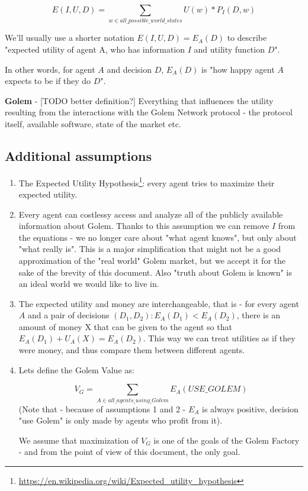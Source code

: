 \documentclass{article}
\begin{document}
\begin{equation}
E(I, U, D) = \sum_{w \in all\_possible\_world\_states}U(w) * P_I(D, w)
\end{equation}

We'll usually use a shorter notation $E(I, U, D) = E_A(D)$ to describe "expected utility of agent A, who has information $I$ and utility function $D$".

In other words, for agent $A$ and decision $D$, $E_A(D)$ is "how happy agent $A$ expects to be if they do $D$".
\newline

\textbf{Golem} - [TODO better definition?] Everything that influences the utility resulting from the interactions with the Golem Network protocol - the protocol itself, available software, state of the market etc.
\newline

\subsection{Additional assumptions}

\begin{enumerate}
\item The Expected Utility Hypothesis\footnote{\href{https://en.wikipedia.org/wiki/Expected\_utility\_hypothesis}{https://en.wikipedia.org/wiki/Expected\_utility\_hypothesis}}: every agent tries to maximize their expected utility.

\item Every agent can costlessy access and analyze all of the publicly available information about Golem. Thanks to this assumption we can remove $I$ from the equations - we no longer
    care about "what agent knows", but only about "what really is". This is a major simplification that might not be a good approximation of the "real world" Golem market, but we
    accept it for the sake of the brevity of this document. Also "truth about Golem is known" is an ideal world we would like to live in.

\item The expected utility and money are interchangeable, that is - for every agent $A$ and a pair of decisions $(D_1, D_2): E_A(D_1) < E_A(D_2)$, there is an amount of money X that
    can be given to the agent so that $E_A(D_1) + U_A(X) = E_A(D_2)$. This way we can treat utilities as if they were money, and thus compare them between different agents.

\item Lets define the Golem Value as:

\begin{equation}
    V_G = \sum_{A \in all\_agents\_using\_Golem}E_A(USE\_GOLEM)
\end{equation}
(Note that - because of assumptions 1 and 2 - $E_A$ is always positive, decision "use Golem" is only made by agents who profit from it).

We assume that maximization of $V_G$ is one of the goals of the Golem Factory - and from the point of view of this document, the only goal.
\end{enumerate}
\end{document}
